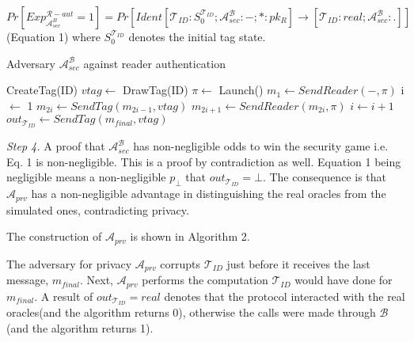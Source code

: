     $Pr[Exp_{\mathcal{A}_{sec}^{B}}^{\mathcal{R}-aut} = 1] = Pr[Ident[\mathcal{T}_{ID}:S_0^{\mathcal{T}_{ID}}; \mathcal{A}_{sec}^{\mathcal{B}}:-; *:pk_{R}]
    \rightarrow [\mathcal{T}_{ID}:real; \mathcal{A}_{sec}^{\mathcal{B}}:.]]$ (Equation 1) where $S_0^{\mathcal{T}_{ID}}$ denotes the initial tag state.
    

    \begin{algorithm}[H] %
        \centering
        \caption{Adversary $\mathcal{A}_{sec}^{\mathcal{B}}$ against reader authentication}
        \begin{algorithmic}[1] %
            \State CreateTag(ID)
            \State $vtag \leftarrow$ DrawTag(ID)
            \State $\pi \leftarrow$ Launch() 
            \State $m_1 \leftarrow SendReader(-,\pi)$ 
            \State i $\leftarrow$ 1
                \State $m_{2i} \gets SendTag(m_{2i-1}, vtag)$ 
                \State $m_{2i+1} \gets SendReader(m_{2i}, \pi)$ 
                \State $i \gets i+1$
            \EndWhile
            \State $out_{\mathcal{T}_{ID}} \gets SendTag(m_{final}, vtag)$ 
        \end{algorithmic}
    \end{algorithm}

    
    \textit{Step 4.} A proof that $\mathcal{A}_{sec}^{\mathcal{B}}$ has non-negligible odds to win the security game i.e. Eq. 1 is non-negligible.
    This is a proof by contradiction as well. Equation 1 being negligible means a non-negligible $p_{\bot}$ that $out_{\mathcal{T}_{ID}} = \bot$.
    The consequence is that $\mathcal{A}_{prv}$ has a non-negligible advantage in distinguishing the real oracles from the simulated ones, contradicting privacy.

    The construction of $\mathcal{A}_{prv}$ is shown in Algorithm 2.

    The adversary for privacy $\mathcal{A}_{prv}$ corrupts $\mathcal{T}_{ID}$ just before it receives the last message, $m_{final}$. Next, $\mathcal{A}_{prv}$
    performs the computation $\mathcal{T}_{ID}$ would have done for $m_{final}$. A result of $out_{\mathcal{T}_{ID}} = real$ denotes that the protocol interacted
    with the real oracles(and the algorithm returns 0), otherwise the calls were made through $\mathcal{B}$(and the algorithm returns 1).

